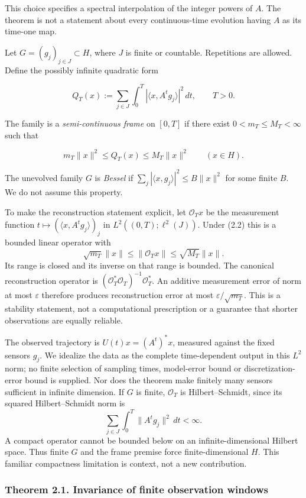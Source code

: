 \documentclass[
  11pt,
]{article}
\begin{document}
This choice specifies a spectral interpolation of the integer powers of
\(A\). The theorem is not a statement about every continuous-time
evolution having \(A\) as its time-one map.

Let \(G=(g_j)_{j\in J}\subset H\), where \(J\) is finite or countable.
Repetitions are allowed. Define the possibly infinite quadratic form

\[
Q_T(x):=\sum_{j\in J}\int_0^T
        |\langle x,A^t g_j\rangle|^2\,dt,
\qquad T>0.                                      \tag{2.1}
\]

The family is a \emph{semi-continuous frame} on \([0,T]\) if there exist
\(0<m_T\leq M_T<\infty\) such that

\[
m_T\|x\|^2\leq Q_T(x)\leq M_T\|x\|^2
\qquad(x\in H).                                  \tag{2.2}
\]

The unevolved family \(G\) is \emph{Bessel} if
\(\sum_j|\langle x,g_j\rangle|^2\leq B\|x\|^2\) for some finite \(B\).
We do not assume this property.

To make the reconstruction statement explicit, let \(\mathcal O_Tx\) be
the measurement function \(t\mapsto(\langle x,A^tg_j\rangle)_j\) in
\(L^2((0,T);\ell^2(J))\). Under (2.2) this is a bounded linear operator
with \[
\sqrt{m_T}\|x\|\leq\|\mathcal O_Tx\|\leq\sqrt{M_T}\|x\|.
\] Its range is closed and its inverse on that range is bounded. The
canonical reconstruction operator is
\((\mathcal O_T^*\mathcal O_T)^{-1}\mathcal O_T^*\). An additive
measurement error of norm at most \(\varepsilon\) therefore produces
reconstruction error at most \(\varepsilon/\sqrt{m_T}\). This is a
stability statement, not a computational prescription or a guarantee
that shorter observations are equally reliable.

The observed trajectory is \(U(t)x=(A^t)^*x\), measured against the
fixed sensors \(g_j\). We idealize the data as the complete
time-dependent output in this \(L^2\) norm; no finite selection of
sampling times, model-error bound or discretization-error bound is
supplied. Nor does the theorem make finitely many sensors sufficient in
infinite dimension. If \(G\) is finite, \(\mathcal O_T\) is
Hilbert--Schmidt, since its squared Hilbert--Schmidt norm is \[
\sum_{j\in J}\int_0^T\|A^tg_j\|^2\,dt<\infty.
\] A compact operator cannot be bounded below on an infinite-dimensional
Hilbert space. Thus finite \(G\) and the frame premise force
finite-dimensional \(H\). This familiar compactness limitation is
context, not a new contribution.

\subsubsection{Theorem 2.1. Invariance of finite observation
windows}\label{theorem-2.1.-invariance-of-finite-observation-windows}
\end{document}
